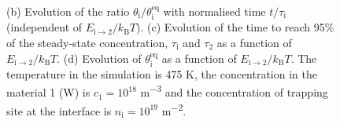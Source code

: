 \begin{figure} [h!]
{    (b) Evolution of the ratio $\theta_\mathrm{i}/\theta_\mathrm{i}^\mathrm{eq}$ with normalised time $t/\tau_\mathrm{i}$ (independent of $E_\mathrm{i\rightarrow2}/k_\mathrm{B}T$).
    (c) Evolution of the time to reach 95\% of the steady-state concentration, $\tau_\mathrm{i}$ and $\tau_\mathrm{2}$ as a function of $E_\mathrm{i \rightarrow 2}/k_\mathrm{B}T$.
    (d) Evolution of $\theta_\mathrm{i}^\mathrm{eq}$ as a function of $E_\mathrm{i\rightarrow2}/k_\mathrm{B}T$.
    The temperature in the simulation is 475 K, the concentration in the material 1 (W) is $c_1=10^{18}$ \si{m^{-3}} and the concentration of trapping site at the interface is $n_\mathrm{i}=10^{19}$ \si{m^{-2}}.}
    \label{fig:kinetic_interface}
\end{figure}

